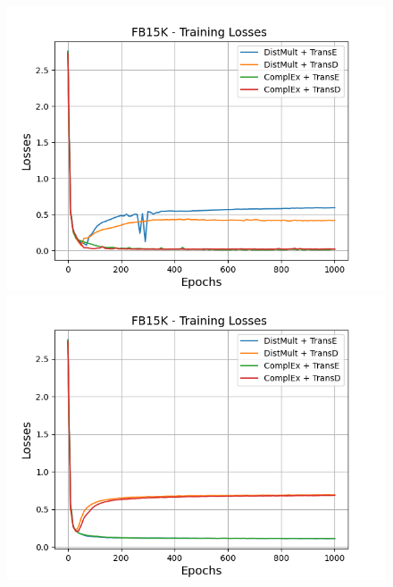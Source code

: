 \begin{figure}[H]
    \centering
    \begin{minipage}{.5\textwidth}
      \centering
      \includegraphics[width=0.9\linewidth]{figures/results/gan_train/not_pretrained/uncertainty/max/entropy/fb15k/1k_epochs/uncertainty_fb15k_losses.png}
    \end{minipage}%
    \begin{minipage}{.5\textwidth}
      \centering
      \includegraphics[width=0.9\linewidth]{figures/results/gan_train/not_pretrained/uncertainty/max_distribution/entropy/fb15k/1k_epochs/uncertainty_fb15k_losses.png}
    \end{minipage}
    \begin{minipage}{.5\textwidth}
      \centering

\end{minipage}
\end{figure}
